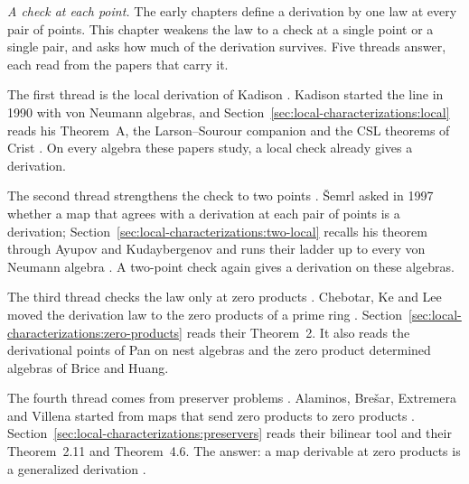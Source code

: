 \emph{A check at each point.} The early chapters define a derivation by
one law at every pair of points. This chapter weakens the law to a check
at a single point or a single pair, and asks how much of the derivation
survives. Five threads answer, each read from the papers that carry it.


The first thread is the local derivation of Kadison
\cite[p.~494]{Kadison1990Local}. Kadison started the line in 1990 with
von Neumann algebras, and Section~\ref{sec:local-characterizations:local}
reads his Theorem~A, the Larson--Sourour companion and the CSL theorems of
Crist \cite[p.~83]{Crist1996Local}. On every algebra these papers study,
a local check already gives a derivation.

The second thread strengthens the check to two points
\cite[p.~15]{AyupovKudaybergenov2012}. \v{S}emrl asked in 1997 whether a
map that agrees with a derivation at each pair of points is a derivation;
Section~\ref{sec:local-characterizations:two-local} recalls his theorem
through Ayupov and Kudaybergenov and runs their ladder up to every von
Neumann algebra \cite[p.~2]{AyupovKudaybergenov2015}. A two-point check
again gives a derivation on these algebras.

The third thread checks the law only at zero products
\cite[p.~218]{ChebotarKeLee2004}. Chebotar, Ke and Lee moved the
derivation law to the zero products of a prime ring
\cite[p.~218]{ChebotarKeLee2004}.
Section~\ref{sec:local-characterizations:zero-products} reads their
Theorem~2. It also reads the derivational points of Pan on nest algebras and
the zero product determined algebras of Brice and Huang.

The fourth thread comes from preserver problems
\cite[p.~131]{AlaminosBresar2009}. Alaminos, Bre\v{s}ar, Extremera and Villena
started from maps that send zero products to zero products
\cite[p.~131]{AlaminosBresar2009}.
Section~\ref{sec:local-characterizations:preservers} reads their bilinear tool
and their Theorem~2.11 and Theorem~4.6. The answer: a map derivable at zero
products is a generalized derivation \cite[p.~131]{AlaminosBresar2009}.

